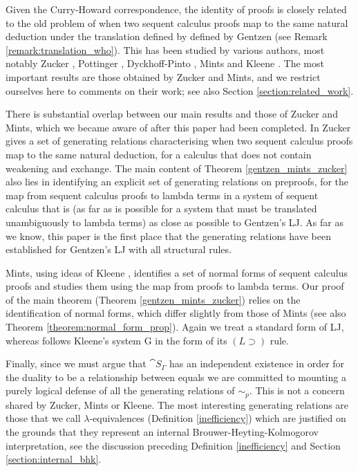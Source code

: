 \documentclass[english,letter paper,12pt,leqno]{article}
\theoremstyle{example}
\numberwithin{equation}{section}
\def\imp{\supset}
\begin{document}
Given the Curry-Howard correspondence, the identity of proofs is closely related to the old problem of when two sequent calculus proofs map to the same natural deduction under the translation defined by defined by Gentzen \cite{gentzen} (see Remark \ref{remark:translation_who}). This has been studied by various authors, most notably Zucker \cite{zucker}, Pottinger \cite{pottinger}, Dyckhoff-Pinto \cite{dyckhoffpinto}, Mints \cite{mints} and Kleene \cite{kleene}. The most important results are those obtained by Zucker and Mints, and we restrict ourselves here to comments on their work; see also Section \ref{section:related_work}.

There is substantial overlap between our main results and those of Zucker and Mints, which we became aware of after this paper had been completed. In \cite{zucker} Zucker gives a set of generating relations characterising when two sequent calculus proofs map to the same natural deduction, for a calculus that does not contain weakening and exchange. The main content of Theorem \ref{gentzen_mints_zucker} also lies in identifying an explicit set of generating relations on preproofs, for the map from sequent calculus proofs to lambda terms in a system of sequent calculus that is (as far as is possible for a system that must be translated unambiguously to lambda terms) as close as possible to Gentzen's LJ. As far as we know, this paper is the first place that the generating relations have been established for Gentzen's LJ with all structural rules.

Mints, using ideas of Kleene \cite{kleene}, identifies a set of normal forms of sequent calculus proofs and studies them using the map from proofs to lambda terms. Our proof of the main theorem (Theorem \ref{gentzen_mints_zucker}) relies on the identification of normal forms, which differ slightly from those of Mints (see also Theorem \ref{theorem:normal_form_prop}). Again we treat a standard form of LJ, whereas \cite{mints} follows Kleene's system G \cite{kleene} in the form of its $(L \imp)$ rule.

Finally, since we must argue that $\cat{S}_\Gamma$ has an independent existence in order for the duality to be a relationship between equals we are committed to mounting a purely logical defense of all the generating relations of $\sim_p$. This is not a concern shared by Zucker, Mints or Kleene. The most interesting generating relations are those that we call $\lambda$-equivalences (Definition \ref{inefficiency}) which are justified on the grounds that they represent an internal Brouwer-Heyting-Kolmogorov interpretation, see the discussion preceding Definition \ref{inefficiency} and Section \ref{section:internal_bhk}.
\end{document}
